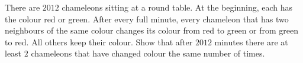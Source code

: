 There are $2012$ chameleons sitting at a round table. At the beginning,
each has the colour red or green. After every full minute, every chameleon that has two
neighbours of the same colour changes its colour from red to green or from green to red.
All others keep their colour. Show that after $2012$ minutes there are at
least $2$ chameleons that have changed colour the same number of times.